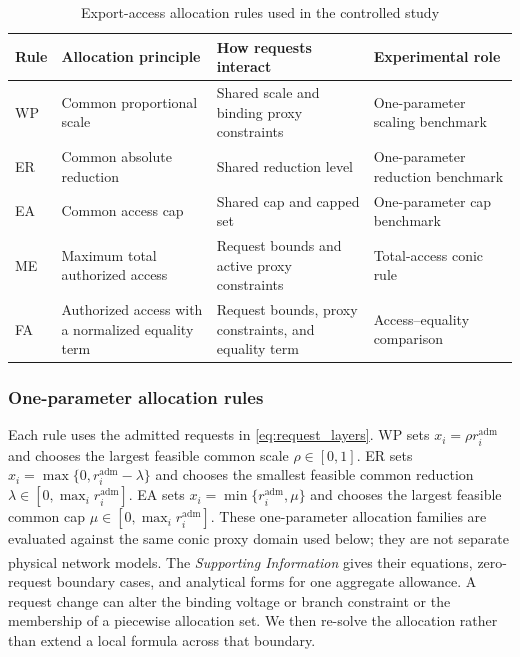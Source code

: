 \documentclass[twoside,twocolumn,9pt]{article}
\newcommand{\suppref}{\textit{Supporting Information}\textsuperscript{\dag}}
\begin{document}
{\begin{table}[!t]
\caption{Export-access allocation rules used in the controlled study}
\label{tab:policy_taxonomy}
\centering
\footnotesize
\setlength{\tabcolsep}{1.8pt}
\renewcommand{\arraystretch}{1.06}
\begin{tabular}{@{}>{\raggedright\arraybackslash}p{0.38in}>{\raggedright\arraybackslash}p{0.84in}>{\raggedright\arraybackslash}p{0.84in}>{\raggedright\arraybackslash}p{0.91in}@{}}
\hline
Rule & Allocation principle & How requests interact & Experimental role \\
\hline
WP & Common proportional scale \cite{alam2023allocation} & Shared scale and binding proxy constraints & One-parameter scaling benchmark \\
ER & Common absolute reduction \cite{liu2020fairness,lusis2020reducing} & Shared reduction level & One-parameter reduction benchmark \\
EA & Common access cap \cite{alam2023allocation} & Shared cap and capped set & One-parameter cap benchmark \\
ME & Maximum total authorized access \cite{liu2022opfenvelopes,mahmoodi2024capacity} & Request bounds and active proxy constraints & Total-access conic rule \\
FA & Authorized access with a normalized equality term \cite{liu2020fairness,gupta2024analysis,gupta2024fairness} & Request bounds, proxy constraints, and equality term & Access--equality comparison \\
\hline
\end{tabular}
\end{table}

\subsubsection{One-parameter allocation rules}

Each rule uses the admitted requests in \eqref{eq:request_layers}. WP sets
$x_i=\rho r_i^{\mathrm{adm}}$ and chooses the largest feasible common scale
$\rho\in[0,1]$. ER sets $x_i=\max\{0,r_i^{\mathrm{adm}}-\lambda\}$ and chooses the
smallest feasible common reduction
$\lambda\in[0,\max_i r_i^{\mathrm{adm}}]$. EA sets
$x_i=\min\{r_i^{\mathrm{adm}},\mu\}$ and chooses the largest feasible common cap
$\mu\in[0,\max_i r_i^{\mathrm{adm}}]$. These one-parameter allocation families
are evaluated against the same conic proxy domain used below; they are not
separate physical network models.
The \suppref{} gives their equations, zero-request boundary cases, and
analytical forms for one aggregate allowance. A request change can alter the binding
voltage or branch constraint or the membership of a piecewise allocation set.
We then re-solve the allocation rather than extend a local formula across that
boundary.

}
\end{document}
